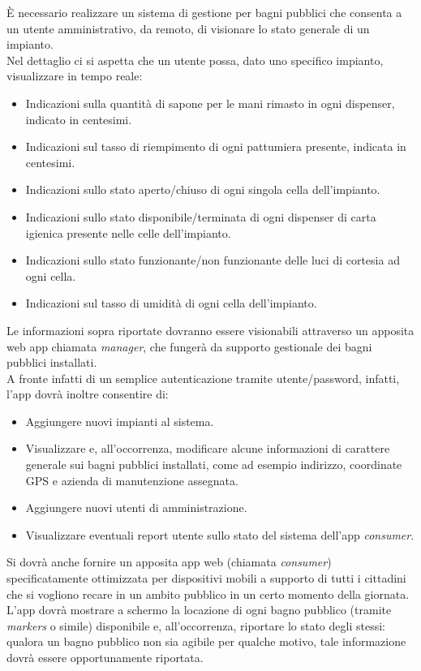 \documentclass[12pt]{article}
\begin{document}
È necessario realizzare un sistema di gestione per bagni pubblici che consenta a un utente amministrativo, da remoto, di visionare lo stato generale di un impianto.\\
Nel dettaglio ci si aspetta che un utente possa, dato uno specifico impianto, visualizzare in tempo reale:
\begin{itemize}
\item Indicazioni sulla quantità di sapone per le mani rimasto in ogni dispenser, indicato in centesimi.
\item Indicazioni sul tasso di riempimento di ogni pattumiera presente, indicata in centesimi.
\item Indicazioni sullo stato aperto/chiuso di ogni singola cella dell'impianto.
\item Indicazioni sullo stato disponibile/terminata di ogni dispenser di carta igienica presente nelle celle dell'impianto.
\item Indicazioni sullo stato funzionante/non funzionante delle luci di cortesia ad ogni cella.
\item Indicazioni sul tasso di umidità di ogni cella dell'impianto.
\end{itemize}
Le informazioni sopra riportate dovranno essere visionabili attraverso un apposita web app chiamata \textit{manager}, che fungerà da supporto gestionale dei bagni pubblici installati.\\
A fronte infatti di un semplice autenticazione tramite utente/password, infatti, l'app dovrà inoltre consentire di: 
\begin{itemize}
\item Aggiungere nuovi impianti al sistema.
\item Visualizzare e, all'occorrenza, modificare alcune informazioni di carattere generale sui bagni pubblici installati, come ad esempio indirizzo, coordinate GPS e azienda di manutenzione assegnata.
\item Aggiungere nuovi utenti di amministrazione.
\item Visualizzare eventuali report utente sullo stato del sistema dell'app \textit{consumer}.
\end{itemize}
Si dovrà anche fornire un apposita app web (chiamata \textit{consumer}) specificatamente ottimizzata per dispositivi mobili a supporto di tutti i cittadini che si vogliono recare in un ambito pubblico in un certo momento della giornata.\\
L'app dovrà mostrare a schermo la locazione di ogni bagno pubblico (tramite \textit{markers} o simile) disponibile e, all'occorrenza, riportare lo stato degli stessi: qualora un bagno pubblico non sia agibile per qualche motivo, tale informazione dovrà essere opportunamente riportata.\\
\end{document}
